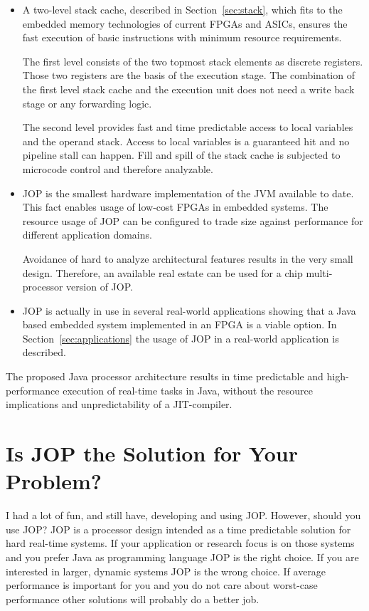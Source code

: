 \begin{itemize}
    \item
A two-level stack cache, described in Section~\ref{sec:stack}, which
fits to the embedded memory technologies of current FPGAs and ASICs,
ensures the fast execution of basic instructions with minimum
resource requirements.


The first level consists of the two topmost stack elements as
discrete registers. Those two registers are the basis of the
execution stage. The combination of the first level stack cache and
the execution unit does not need a write back stage or any
forwarding logic.


The second level provides fast and time predictable access to local
variables and the operand stack. Access to local variables is a
guaranteed hit and no pipeline stall can happen. Fill and spill of
the stack cache is subjected to microcode control and therefore
analyzable.


    \item
JOP is the smallest hardware implementation of the JVM available to
date. This fact enables usage of low-cost FPGAs in embedded systems.
The resource usage of JOP can be configured to trade size against
performance for different application domains.

Avoidance of hard to analyze architectural features results in the
very small design. Therefore, an available real estate can be used
for a chip multi-processor version of JOP.


    \item
JOP is actually in use in several real-world applications showing
that a Java based embedded system implemented in an FPGA is a viable
option. In Section~\ref{sec:applications} the usage of JOP in a
real-world application is described.

\end{itemize}

The proposed Java processor architecture results in time predictable
and high-performance execution of real-time tasks in Java, without
the resource implications and unpredictability of a JIT-compiler.

\section{Is JOP the Solution for Your Problem?}

I had a lot of fun, and still have, developing and using JOP.
However, should you use JOP? JOP is a processor design intended as a
time predictable solution for hard real-time systems. If your
application or research focus is on those systems and you prefer
Java as programming language JOP is the right choice. If you are
interested in larger, dynamic systems JOP is the wrong choice. If
average performance is important for you and you do not care about
worst-case performance other solutions will probably do a better
job.

